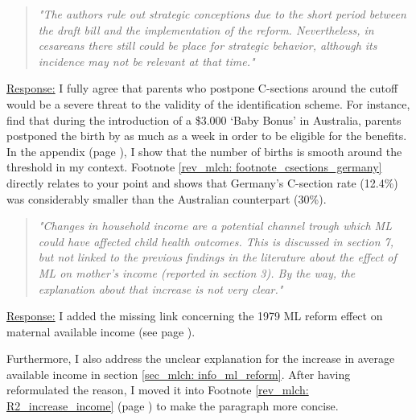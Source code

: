 \begin{quote}
	\textit{"The authors rule out strategic conceptions due to the short period between the draft bill and the implementation of the reform. Nevertheless, in cesareans there still could be place for strategic behavior, although its incidence may not be relevant at that time."}
\end{quote}
\underline{Response:} I fully agree that parents who postpone C-sections around the cutoff would be a severe threat to the validity of the identification scheme. For instance, \cite{gans2009born} find that during the introduction of a \$3.000 `Baby Bonus' in Australia, parents postponed the birth by as much as a week in order to be eligible for the benefits. In the appendix (page \pageref{sec_mlch:empirical_strategy_threats+validity}), I show that the number of births is smooth around the threshold in my context. Footnote \ref{rev_mlch: footnote_csections_germany} directly relates to your point and shows that Germany's C-section rate (12.4\%) was considerably smaller than the Australian counterpart (30\%).

 


\begin{quote}
	\textit{"Changes in household income are a potential channel trough which ML could have affected child health outcomes. This is discussed in section 7, but not linked to the previous findings in the literature about the effect of ML on mother's income (reported in section 3). By the way, the explanation about that increase is not very clear."}
\end{quote}
\underline{Response:} I added the missing link concerning the 1979 ML reform effect on maternal available income (see page \pageref{rev_mlch: r2_maternal_income_missing_link}). 

Furthermore, I also address the unclear explanation for the increase in average available income in section \ref{sec_mlch: info_ml_reform}. After having reformulated the reason, I moved it into Footnote \ref{rev_mlch: R2_increase_income} (page \pageref{rev_mlch: R2_increase_income}) to make the paragraph more concise. 



